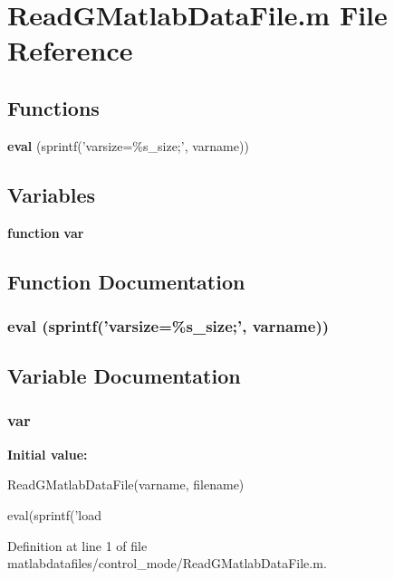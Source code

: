 \section{ReadGMatlabDataFile.m File Reference}
\label{matlabdatafiles_2control__mode_2ReadGMatlabDataFile_8m}
\subsection*{Functions}
\begin{DoxyCompactItemize}
\item 
{\bf eval} (sprintf('varsize=\%s\_\-size;', varname))
\end{DoxyCompactItemize}
\subsection*{Variables}
\begin{DoxyCompactItemize}
\item 
{\bf function} {\bf var}
\end{DoxyCompactItemize}


\subsection{Function Documentation}
\subsubsection[{eval}]{\setlength{\rightskip}{0pt plus 5cm}eval (sprintf('varsize=\%s\_\-size;', varname))}\label{matlabdatafiles_2control__mode_2ReadGMatlabDataFile_8m_a6f217d64e43fd40c2eb04a81e57d7a1f}


\subsection{Variable Documentation}
\subsubsection[{var}]{ {\bf var}}\label{matlabdatafiles_2control__mode_2ReadGMatlabDataFile_8m_a4fdd13e26a831c0dff92f623df42f347}
{\bfseries Initial value:}
\begin{DoxyCode}
 ReadGMatlabDataFile(varname, filename)

eval(sprintf('load %
\end{DoxyCode}


Definition at line 1 of file matlabdatafiles/control\_\-mode/ReadGMatlabDataFile.m.